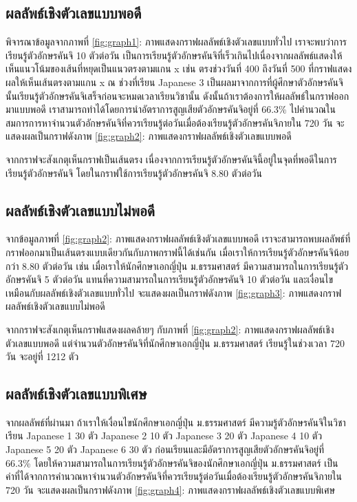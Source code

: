 \documentclass{article}
\begin{document}
\subsection{ผลลัพธ์เชิงตัวเลขแบบพอดี}
พิจารณาข้อมูลจากภาพที่ \ref{fig:graph1}: ภาพแสดงกราฟผลลัพธ์เชิงตัวเลขแบบทั่วไป เราจะพบว่าการเรียนรู้ตัวอักษรคันจิ 10 ตัวต่อวัน เป็นการเรียนรู้ตัวอักษรคันจิที่เร็วเกินไปเนื่องจากผลลัพธ์แสดงให้เห็นแนวโน้มของเส้นที่หยุดเป็นแนวตรงตามแกน x เช่น ตรงช่วงวันที่ 400 ถึงวันที่ 500 ที่กราฟแสดงผลให้เห็นเส้นตรงตามแกน x ณ ช่วงที่เรียน Japanese 3 เป็นผลมาจากการที่ผู้ศึกษาตัวอักษรคันจินั้นเรียนรู้ตัวอักษรคันจิเสร็จก่อนจะหมดเวลาเรียนวิชานั้น ดังนั้นถ้าเราต้องการให้ผลลัพธ์ในกราฟออกมาแบบพอดี เราสามารถทำได้โดยการนำอัตราการสูญเสียตัวอักษรคันจิอยู่ที่ 66.3\%\cite{ebbinghaus1913memory} ไปคำนวณในสมการการหาจำนวนตัวอักษรคันจิที่ควรเรียนรู้ต่อวันเมื่อต้องเรียนรู้ตัวอักษรคันจิภายใน 720 วัน จะแสดงผลเป็นกราฟดังภาพ \ref{fig:graph2}: ภาพแสดงกราฟผลลัพธ์เชิงตัวเลขแบบพอดี

จากกราฟจะสังเกตุเห็นกราฟเป็นเส้นตรง เนื่องจากการเรียนรู้ตัวอักษรคันจินี้อยู่ในจุดที่พอดีในการเรียนรู้ตัวอักษรคันจิ โดยในกราฟใช้การเรียนรู้ตัวอักษรคันจิ 8.80 ตัวต่อวัน

\subsection{ผลลัพธ์เชิงตัวเลขแบบไม่พอดี}
จากข้อมูลภาพที่ \ref{fig:graph2}: ภาพแสดงกราฟผลลัพธ์เชิงตัวเลขแบบพอดี เราจะสามารถพบผลลัพธ์ที่กราฟออกมาเป็นเส้นตรงแบบเดียวกันกับภาพกราฟนี้ได้เช่นกัน เมื่อเราให้การเรียนรู้ตัวอักษรคันจิน้อยกว่า 8.80 ตัวต่อวัน เช่น เมื่อเราให้นักศึกษาเอกญี่ปุ่น ม.ธรรมศาสตร์ มีความสามารถในการเรียนรู้ตัวอักษรคันจิ 5 ตัวต่อวัน แทนที่ความสามารถในการเรียนรู้ตัวอักษรคันจิ 10 ตัวต่อวัน และเงื่อนไขเหมือนกับผลลัพธ์เชิงตัวเลขแบบทั่วไป จะแสดงผลเป็นกราฟดังภาพ \ref{fig:graph3}: ภาพแสดงกราฟผลลัพธ์เชิงตัวเลขแบบไม่พอดี 

จากกราฟจะสังเกตุเห็นกราฟแสดงผลคล้ายๆ กับภาพที่ \ref{fig:graph2}: ภาพแสดงกราฟผลลัพธ์เชิงตัวเลขแบบพอดี แต่จำนวนตัวอักษรคันจิที่นักศึกษาเอกญี่ปุ่น ม.ธรรมศาสตร์ เรียนรู้ในช่วงเวลา 720 วัน จะอยู่ที่ 1212 ตัว

\subsection{ผลลัพธ์เชิงตัวเลขแบบพิเศษ}
จากผลลัพธ์ที่ผ่านมา ถ้าเราให้เงื่อนไขนักศึกษาเอกญี่ปุ่น ม.ธรรมศาสตร์ มีความรู้ตัวอักษรคันจิในวิชาเรียน Japanese 1 30 ตัว Japanese 2 10 ตัว Japanese 3 20 ตัว Japanese 4 10 ตัว Japanese 5 20 ตัว Japanese 6 30 ตัว ก่อนเรียนและมีอัตราการสูญเสียตัวอักษรคันจิอยู่ที่ 66.3\%\cite{ebbinghaus1913memory} โดยให้ความสามารถในการเรียนรู้ตัวอักษรคันจิของนักศึกษาเอกญี่ปุ่น ม.ธรรมศาสตร์ เป็นค่าที่ได้จากการคำนวณหาจำนวนตัวอักษรคันจิที่ควรเรียนรู้ต่อวันเมื่อต้องเรียนรู้ตัวอักษรคันจิภายใน 720 วัน จะแสดงผลเป็นกราฟดังภาพ \ref{fig:graph4}: ภาพแสดงกราฟผลลัพธ์เชิงตัวเลขแบบพิเศษ
\end{document}
